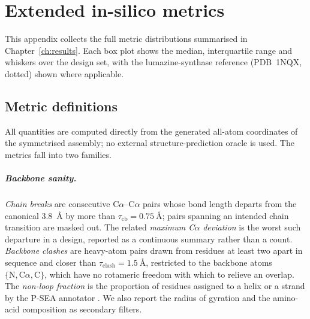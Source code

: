 \chapter{Extended in-silico metrics}
\label{app:extended}

This appendix collects the full metric distributions summarised in
Chapter~\ref{ch:results}. Each box plot shows the median, interquartile range and
whiskers over the design set, with the lumazine-synthase reference
(PDB~1NQX, dotted) shown where applicable.

\section{Metric definitions}
\label{app:metric-defs}

All quantities are computed directly from the generated all-atom coordinates of
the symmetrised assembly; no external structure-prediction oracle is used. The
metrics fall into two families.

\paragraph{Backbone sanity.}
\emph{Chain breaks} are consecutive C$\alpha$--C$\alpha$ pairs whose bond length
departs from the canonical \SI{3.8}{\angstrom} by more than
$\tau_\text{cb}=\SI{0.75}{\angstrom}$; pairs spanning an intended chain
transition are masked out. The related \emph{maximum C$\alpha$ deviation} is the
worst such departure in a design, reported as a continuous summary rather than a
count. \emph{Backbone clashes} are heavy-atom pairs drawn from residues at least
two apart in sequence and closer than $\tau_\text{clash}=\SI{1.5}{\angstrom}$,
restricted to the backbone atoms $\{\text{N},\text{C}\alpha,\text{C}\}$, which
have no rotameric freedom with which to relieve an overlap. The \emph{non-loop
fraction} is the proportion of residues assigned to a helix or a strand by the
P-SEA annotator \parencite{labesse_p-sea_1997}. We also report the radius of
gyration and the amino-acid composition as secondary filters.


